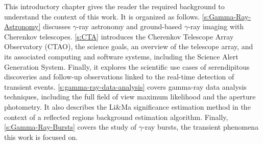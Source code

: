 \begin{chapabstract}
\small{
This introductory chapter gives the reader the required background to understand the context of this work. It is organized as follows.
\autoref{s:Gamma-Ray-Astronomy} discusses $\gamma$-ray astronomy and ground-based $\gamma$-ray imaging with Cherenkov telescopes. \autoref{s:CTA} introduces the Cherenkov Telescope Array Observatory (CTAO), the science goals, an overview of the telescope array, and its associated computing and software systems, including the Science Alert Generation System. Finally, it explores the scientific use cases of serendipitous discoveries and follow-up observations linked to the real-time detection of transient events. \autoref{s:gamma-ray-data-analysis} covers gamma-ray data analysis techniques, including the full field of view maximum likelihood and the aperture photometry. It also describes the Li\&Ma significance estimation method in the context of a reflected regions background estimation algorithm. Finally, \autoref{s:Gamma-Ray-Bursts} covers the study of $\gamma$-ray bursts, the transient phenomena this work is focused on.
}\\
\begin{center}
\noindent\makebox[0.8\linewidth]{\rule{0.66\paperwidth}{0.4pt}}
\end{center}
\vspace{1cm}
\end{chapabstract}

